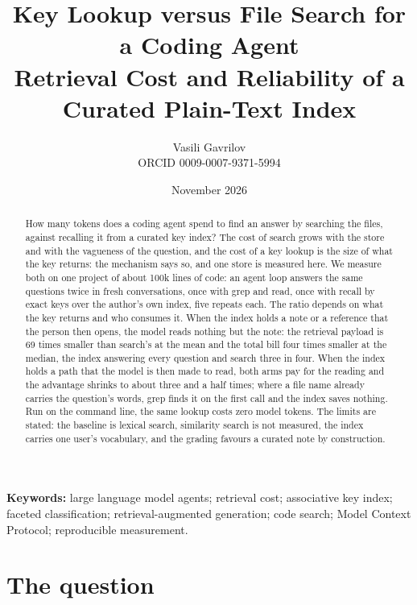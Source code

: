 \documentclass[11pt]{article}
\title{\textbf{Key Lookup versus File Search for a Coding Agent}\\[2pt]
\large Retrieval Cost and Reliability of a Curated Plain-Text Index}
\author{Vasili Gavrilov\\\small ORCID 0009-0007-9371-5994}
\date{November 2026}
\begin{document}
\maketitle

\begin{abstract}
\noindent How many tokens does a coding agent spend to find an answer by searching the
files, against recalling it from a curated key index? The cost of search grows
with the store and with the vagueness of the question, and the cost of a key
lookup is the size of what the key returns: the mechanism says so, and one
store is measured here. We measure both on one project of about
100k lines of code: an agent loop answers the same questions twice in fresh
conversations, once with grep and read, once with recall by exact keys over the
author's own index, five repeats each. The ratio depends on what the key returns
and who consumes it. When the index holds a note or a reference that the person
then opens, the model reads nothing but the note: the retrieval payload is 69
times smaller than search's at the mean and the total bill four times smaller at
the median, the index answering every question and search three in four. When
the index holds a path that the model is then made to read, both arms pay for
the reading and the advantage shrinks to about three and a half times; where a
file name already carries the question's words, grep finds it on the first call
and the index saves nothing. Run on the command line, the same lookup costs zero
model tokens. The limits are stated: the baseline is lexical search, similarity
search is not measured, the index carries one user's vocabulary, and the grading
favours a curated note by construction.
\end{abstract}

\noindent\textbf{Keywords:} large language model agents; retrieval cost; associative
key index; faceted classification; retrieval-augmented generation; code search;
Model Context Protocol; reproducible measurement.

\section{The question}
\end{document}
